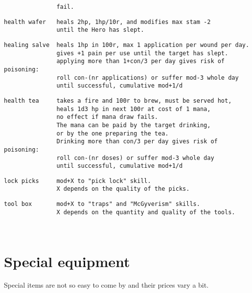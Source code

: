 \begin{samepage}
\begin{verbatim}
               fail.
\end{verbatim} \blocklistgap \begin{verbatim}
health wafer   heals 2hp, 1hp/10r, and modifies max stam -2
               until the Hero has slept.
\end{verbatim} \blocklistgap \begin{verbatim}
healing salve  heals 1hp in 100r, max 1 application per wound per day.
               gives +1 pain per use until the target has slept.
               applying more than 1+con/3 per day gives risk of poisoning:
               roll con-(nr applications) or suffer mod-3 whole day
               until successful, cumulative mod+1/d
\end{verbatim} \blocklistgap \begin{verbatim}
health tea     takes a fire and 100r to brew, must be served hot,
               heals 1d3 hp in next 100r at cost of 1 mana,
               no effect if mana draw fails.
               The mana can be paid by the target drinking,
               or by the one preparing the tea.
               Drinking more than con/3 per day gives risk of poisoning:
               roll con-(nr doses) or suffer mod-3 whole day
               until successful, cumulative mod+1/d
\end{verbatim} \blocklistgap \begin{verbatim}
lock picks     mod+X to "pick lock" skill.
               X depends on the quality of the picks.
\end{verbatim} \blocklistgap \begin{verbatim}
tool box       mod+X to "traps" and "McGyverism" skills.
               X depends on the quantity and quality of the tools.
\end{verbatim} \end{samepage} \normalsize

\










\section*{Special equipment}

Special items are not so easy to come by and their prices vary a bit.

